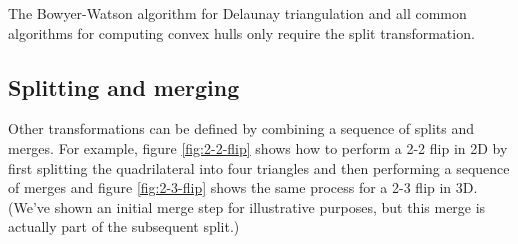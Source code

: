 \documentclass[twocolumn]{article}
\begin{document}
The Bowyer-Watson algorithm \cite{bowyer1981computing, watson1981computing} for Delaunay triangulation and all common algorithms for computing convex hulls \cite{berg1997computational} only require the split transformation.

\subsection{Splitting and merging}

Other transformations can be defined by combining a sequence of splits and merges.
For example, figure \ref{fig:2-2-flip} shows how to perform a 2-2 flip in 2D by first splitting the quadrilateral into four triangles and then performing a sequence of merges and figure \ref{fig:2-3-flip} shows the same process for a 2-3 flip in 3D.
(We've shown an initial merge step for illustrative purposes, but this merge is actually part of the subsequent split.)
\end{document}
